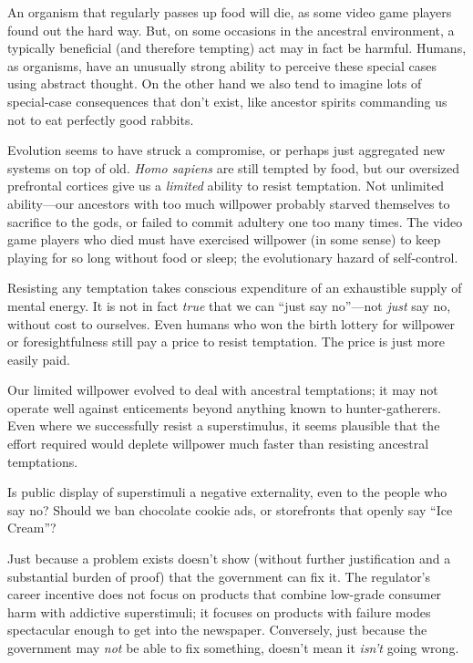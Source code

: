 {
 An organism that regularly passes up food will die, as some video
game players found out the hard way. But, on some occasions in the
ancestral environment, a typically beneficial (and therefore tempting)
act may in fact be harmful. Humans, as organisms, have an unusually
strong ability to perceive these special cases using abstract thought.
On the other hand we also tend to imagine lots of special-case
consequences that don't exist, like ancestor spirits
commanding us not to eat perfectly good rabbits.}

{
 Evolution seems to have struck a compromise, or perhaps just
aggregated new systems on top of old. \textit{Homo sapiens} are still
tempted by food, but our oversized prefrontal cortices give us a
\textit{limited} ability to resist temptation. Not unlimited
ability---our ancestors with too much willpower probably starved
themselves to sacrifice to the gods, or failed to commit adultery one
too many times. The video game players who died must have exercised
willpower (in some sense) to keep playing for so long without food or
sleep; the evolutionary hazard of self-control.}

{
 Resisting any temptation takes conscious expenditure of an
exhaustible supply of mental energy. It is not in fact \textit{true}
that we can ``just say no''---not
\textit{just} say no, without cost to ourselves. Even humans who won
the birth lottery for willpower or foresightfulness still pay a price
to resist temptation. The price is just more easily paid.}

{
 Our limited willpower evolved to deal with ancestral temptations;
it may not operate well against enticements beyond anything known to
hunter-gatherers. Even where we successfully resist a superstimulus, it
seems plausible that the effort required would deplete willpower much
faster than resisting ancestral temptations.}

{
 Is public display of superstimuli a negative externality, even to
the people who say no? Should we ban chocolate cookie ads, or
storefronts that openly say ``Ice
Cream''?}

{
 Just because a problem exists doesn't show
(without further justification and a substantial burden of proof) that
the government can fix it. The regulator's career
incentive does not focus on products that combine low-grade consumer
harm with addictive superstimuli; it focuses on products with failure
modes spectacular enough to get into the newspaper. Conversely, just
because the government may \textit{not} be able to fix something,
doesn't mean it \textit{isn't} going
wrong.}

